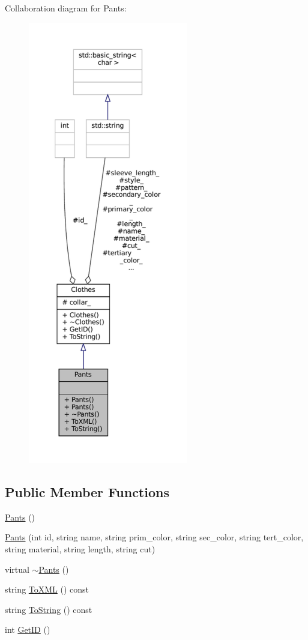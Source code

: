 Collaboration diagram for Pants\+:\nopagebreak
\begin{figure}[H]
\begin{center}
\leavevmode
\includegraphics[height=550pt]{classPants__coll__graph}
\end{center}
\end{figure}
\subsection*{Public Member Functions}
\begin{DoxyCompactItemize}
\item 
\mbox{\hyperlink{classPants_a6e19084b693fdb83029addacdecdc2e2}{Pants}} ()
\item 
\mbox{\hyperlink{classPants_a9ca6f6ddce0ac46556b6e56a9d73ddd0}{Pants}} (int id, string name, string prim\+\_\+color, string sec\+\_\+color, string tert\+\_\+color, string material, string length, string cut)
\item 
virtual \mbox{\hyperlink{classPants_a22fa728c533ab55fbbd1b77b8d9ad860}{$\sim$\+Pants}} ()
\item 
string \mbox{\hyperlink{classPants_aa62270b70cbb40b7b420f1091ad7e43b}{To\+X\+ML}} () const
\item 
string \mbox{\hyperlink{classPants_a9b5fcde766a77877bf428e18c65f1e70}{To\+String}} () const
\item 
int \mbox{\hyperlink{classClothes_a3f6dac172f333126d19010f85ec44e4c}{Get\+ID}} ()
\end{DoxyCompactItemize}
